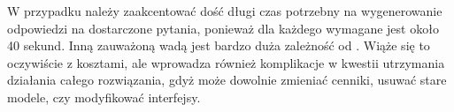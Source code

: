 W przypadku  należy zaakcentować dość długi czas potrzebny na wygenerowanie odpowiedzi na dostarczone pytania, ponieważ dla każdego wymagane jest około 40 sekund. Inną zauważoną wadą jest bardzo duża zależność od . Wiąże się to oczywiście z kosztami, ale wprowadza również komplikacje w kwestii utrzymania działania całego rozwiązania, gdyż  może dowolnie zmieniać cenniki, usuwać stare modele, czy modyfikować interfejsy.